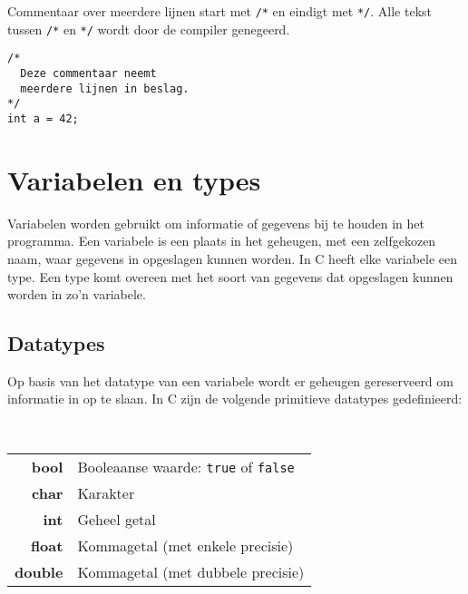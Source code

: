\documentclass[11pt,fleqn]{book} %
\def\Cpp{{C\nolinebreak[4]\hspace{-.05em}\raisebox{.4ex}{\tiny\bf ++}}}
\begin{document}
\noindent Commentaar over meerdere lijnen start met \texttt{/*} en eindigt met \texttt{*/}. Alle tekst tussen \texttt{/*} en \texttt{*/} wordt door de compiler genegeerd.

\begin{example}
	\phantom{ }
	\begin{verbatim}
/*
  Deze commentaar neemt
  meerdere lijnen in beslag.
*/
int a = 42;
	\end{verbatim}
\end{example}

\chapter{Variabelen en types}
Variabelen worden gebruikt om informatie of gegevens bij te houden in het programma. Een variabele is een plaats in het geheugen, met een zelfgekozen naam, waar gegevens in opgeslagen kunnen worden. In \Cpp{} heeft elke variabele een type. Een type komt overeen met het soort van gegevens dat opgeslagen kunnen worden in zo'n variabele.

\section{Datatypes}

Op basis van het datatype van een variabele wordt er geheugen gereserveerd om informatie in op te slaan. In \Cpp{} zijn de volgende primitieve datatypes gedefinieerd:

\begin{definition}
	\phantom{ } \\
	\begin{minipage}{\columnwidth}
		\vspace{0.1cm}
		\begin{tabular}{rl}
			\textbf{bool} & Booleaanse waarde: \texttt{true} of \texttt{false} \\
			\textbf{char} & Karakter \\
			\textbf{int} & Geheel getal \\
			\textbf{float} & Kommagetal (met enkele precisie) \\
			\textbf{double} & Kommagetal (met dubbele precisie)
		\end{tabular}
		\vspace{0.1cm}
	\end{minipage}
\end{definition}
\end{document}

